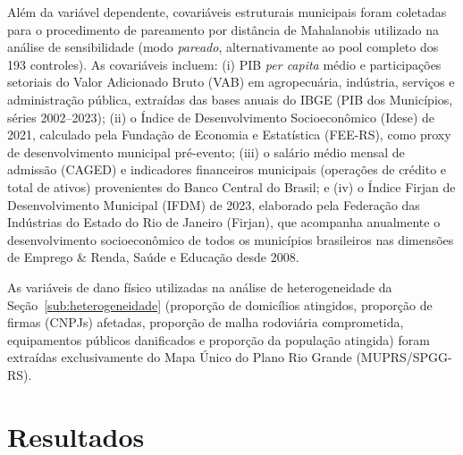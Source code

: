 \documentclass[a4paper,12pt]{article}
\begin{document}
Além da variável dependente, covariáveis estruturais municipais foram coletadas para o
procedimento de pareamento por distância de Mahalanobis utilizado na análise de
sensibilidade (modo \emph{pareado}, alternativamente ao pool completo dos 193 controles).
As covariáveis incluem: (i) PIB \textit{per capita} médio e participações setoriais do Valor
Adicionado Bruto (VAB) em agropecuária, indústria, serviços e administração pública,
extraídas das bases anuais do IBGE (PIB dos Municípios, séries 2002–2023); (ii) o Índice
de Desenvolvimento Socioeconômico (Idese) de 2021, calculado pela Fundação de
Economia e Estatística (FEE-RS), como proxy de desenvolvimento municipal pré-evento;
(iii) o salário médio mensal de admissão (CAGED) e indicadores financeiros municipais
(operações de crédito e total de ativos) provenientes do Banco Central do Brasil;
e (iv) o Índice Firjan de Desenvolvimento Municipal (IFDM) de 2023, elaborado pela
Federação das Indústrias do Estado do Rio de Janeiro (Firjan), que acompanha anualmente
o desenvolvimento socioeconômico de todos os municípios brasileiros nas dimensões de
Emprego \& Renda, Saúde e Educação desde 2008.

As variáveis de dano físico utilizadas na análise de heterogeneidade da
Seção~\ref{sub:heterogeneidade} (proporção de domicílios atingidos, proporção de
firmas (CNPJs) afetadas, proporção de malha rodoviária comprometida, equipamentos
públicos danificados e proporção da população atingida) foram extraídas exclusivamente
do Mapa Único do Plano Rio Grande (MUPRS/SPGG-RS).


\section{Resultados}
\label{sec:resultados}
\end{document}
